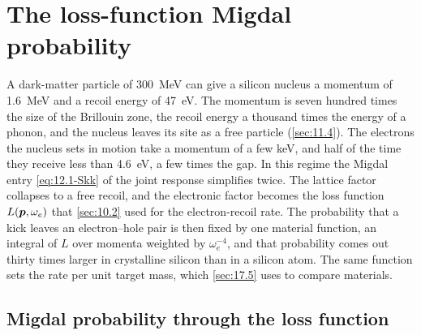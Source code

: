\section{The loss-function Migdal probability}\label{sec:12.3}

A dark-matter particle of \SI{300}{MeV} can give a silicon nucleus a momentum of \SI{1.6}{MeV} and a recoil energy of \SI{47}{eV}. The momentum is seven hundred times the size of the Brillouin zone, the recoil energy a thousand times the energy of a phonon, and the nucleus leaves its site as a free particle (\cref{sec:11.4}). The electrons the nucleus sets in motion take a momentum of a few keV, and half of the time they receive less than \SI{4.6}{eV}, a few times the gap. In this regime the Migdal entry \cref{eq:12.1-Skk} of the joint response simplifies twice. The lattice factor collapses to a free recoil, and the electronic factor becomes the loss function $L(\bm{p},\omega_e)$ that \cref{sec:10.2} used for the electron-recoil rate. The probability that a kick leaves an electron--hole pair is then fixed by one material function, an integral of $L$ over momenta weighted by $\omega_e^{-4}$, and that probability comes out thirty times larger in crystalline silicon than in a silicon atom. The same function sets the rate per unit target mass, which \cref{sec:17.5} uses to compare materials.

\subsection{Migdal probability through the loss function}\label{sec:12.3-soft}

